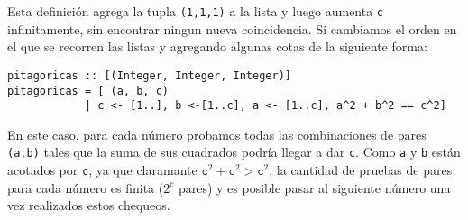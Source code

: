Esta definición agrega la tupla \texttt{(1,1,1)} a la lista y luego aumenta \texttt{c} infinitamente, sin encontrar ningun nueva coincidencia. Si cambiamos el orden en el que se recorren las listas y agregando algunas cotas de la siguiente forma:
\begin{centrado}
\begin{verbatim}
pitagoricas :: [(Integer, Integer, Integer)]
pitagoricas = [ (a, b, c)
            | c <- [1..], b <-[1..c], a <- [1..c], a^2 + b^2 == c^2]
\end{verbatim}
\end{centrado}
En este caso, para cada número probamos todas las combinaciones de pares \texttt{(a,b)} tales que la suma de sus cuadrados podría llegar a dar \texttt{c}. Como \texttt{a} y \texttt{b} están acotados por \texttt{c}, ya que claramante $\texttt{c}^2 + \texttt{c}^2 > \texttt{c}^2$, la cantidad de pruebas de pares para cada número es finita ($2^c$ pares) y es posible pasar al siguiente número una vez realizados estos chequeos.
